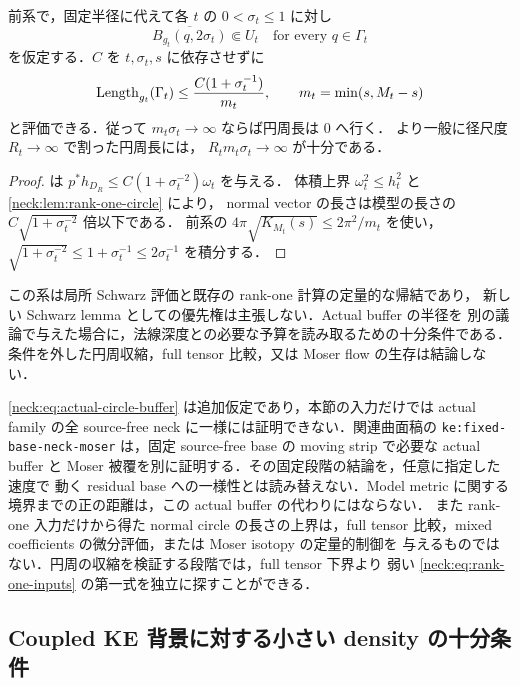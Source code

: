 \begin{corollary}
\label{neck:cor:shrinking-buffer-circle}
前系で，固定半径に代えて各 $t$ の $0<\sigma_t\le1$ に対し
\[
 \overline{B_{g_t}(q,2\sigma_t)}\Subset U_t
 \quad\text{for every }q\in\Gamma_t
\]
を仮定する．$C$ を $t,\sigma_t,s$ に依存させずに
\begin{equation}\label{neck:eq:shrinking-buffer-circle}
 \operatorname{Length}_{g_t}(\Gamma_t)
 \le \frac{C(1+\sigma_t^{-1})}{m_t},
 \qquad m_t=\min(s,M_t-s)
\end{equation}
と評価できる．従って $m_t\sigma_t\to\infty$ ならば円周長は $0$ へ行く．
より一般に径尺度 $R_t\to\infty$ で割った円周長には，
$R_tm_t\sigma_t\to\infty$ が十分である．
\end{corollary}

\begin{proof}
 は
$p^*h_{D_R}\le C(1+\sigma_t^{-2})\omega_t$ を与える．
体積上界 $\omega_t^2\le h_t^2$ と \cref{neck:lem:rank-one-circle} により，
normal vector の長さは模型の長さの $C\sqrt{1+\sigma_t^{-2}}$ 倍以下である．
前系の $4\pi\sqrt{K_{M_t}(s)}\le2\pi^2/m_t$ を使い，
$\sqrt{1+\sigma_t^{-2}}\le1+\sigma_t^{-1}\le2\sigma_t^{-1}$ を積分する．
\end{proof}

この系は局所 Schwarz 評価と既存の rank-one 計算の定量的な帰結であり，
新しい Schwarz lemma としての優先権は主張しない．Actual buffer の半径を
別の議論で与えた場合に，法線深度との必要な予算を読み取るための十分条件である．
条件を外した円周収縮，full tensor 比較，又は Moser flow の生存は結論しない．

\eqref{neck:eq:actual-circle-buffer} は追加仮定であり，本節の入力だけでは actual family
の全 source-free neck に一様には証明できない．関連曲面稿\cite{LagrangianCurrent}の
\texttt{ke:fixed-base-neck-moser} は，固定 source-free base の moving strip で必要な
actual buffer と Moser 被覆を別に証明する．その固定段階の結論を，任意に指定した速度で
動く residual base への一様性とは読み替えない．Model metric に関する
境界までの正の距離は，この actual buffer の代わりにはならない．
また rank-one 入力だけから得た normal circle の長さの上界は，full tensor
比較，mixed coefficients の微分評価，または Moser isotopy の定量的制御を
与えるものではない．円周の収縮を検証する段階では，full tensor 下界より
弱い \eqref{neck:eq:rank-one-inputs} の第一式を独立に探すことができる．

\subsection{Coupled KE 背景に対する小さい density の十分条件}

